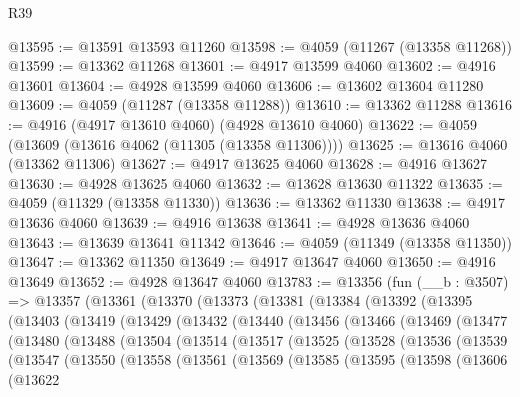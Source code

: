\begin{lexlean}{R39}
\begin{coremodule}
@13595 := @13591 @13593 @11260
@13598 := @4059 (@11267 (@13358 @11268))
@13599 := @13362 @11268
@13601 := @4917 @13599 @4060
@13602 := @4916 @13601
@13604 := @4928 @13599 @4060
@13606 := @13602 @13604 @11280
@13609 := @4059 (@11287 (@13358 @11288))
@13610 := @13362 @11288
@13616 := @4916 (@4917 @13610 @4060) (@4928 @13610 @4060)
@13622 := @4059 (@13609 (@13616 @4062 (@11305 (@13358 @11306))))
@13625 := @13616 @4060 (@13362 @11306)
@13627 := @4917 @13625 @4060
@13628 := @4916 @13627
@13630 := @4928 @13625 @4060
@13632 := @13628 @13630 @11322
@13635 := @4059 (@11329 (@13358 @11330))
@13636 := @13362 @11330
@13638 := @4917 @13636 @4060
@13639 := @4916 @13638
@13641 := @4928 @13636 @4060
@13643 := @13639 @13641 @11342
@13646 := @4059 (@11349 (@13358 @11350))
@13647 := @13362 @11350
@13649 := @4917 @13647 @4060
@13650 := @4916 @13649
@13652 := @4928 @13647 @4060
@13783 := @13356
    (fun (__b : @3507) =>
    @13357
      (@13361
        (@13370
          (@13373
            (@13381
              (@13384
                (@13392
                  (@13395
                    (@13403
                      (@13419
                        (@13429
                          (@13432
                            (@13440
                              (@13456
                                (@13466
                                  (@13469
                                    (@13477
                                      (@13480
                                        (@13488
                                          (@13504
                                            (@13514
                                              (@13517
                                                (@13525
                                                  (@13528
                                                    (@13536
                                                      (@13539
                                                        (@13547
                                                          (@13550
                                                            (@13558
                                                              (@13561
                                                                (@13569
                                                                  (@13585
                                                                    (@13595
                                                                      (@13598
                                                                        (@13606
                                                                          (@13622

\end{coremodule}
\end{lexlean}

